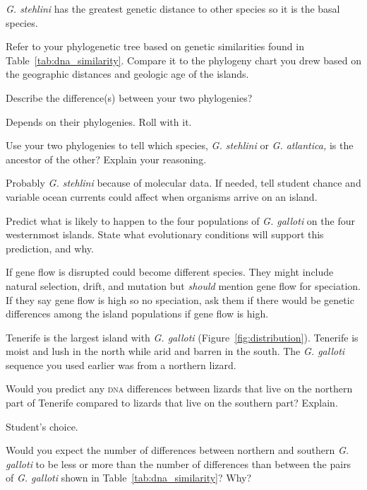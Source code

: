 \documentclass[12pt, hidelinks]{exam}
\newcommand*\AnswerBox[2]{%
    \parbox[t][#1]{0.92\textwidth}{%
    \begin{solution}#2\end{solution}}
    \vspace{\stretch{1}}
}
\begin{document}
\begin{questions}
\AnswerBox{2\baselineskip}{\textit{G. stehlini} has the greatest genetic distance to other species so it is the basal species.}

Refer to your phylogenetic tree based on genetic similarities found in Table~\ref{tab:dna_similarity}. Compare it to the phylogeny chart you drew based on the geographic distances and geologic age of the islands. 

\question Describe the difference(s) between your two phylogenies? 

\AnswerBox{2\baselineskip}{Depends on their phylogenies. Roll with it.}

\question
Use your two phylogenies to tell which species, \textit{G. stehlini} or \textit{G. atlantica,} is the ancestor of the other? Explain your reasoning. 

\AnswerBox{3\baselineskip}{Probably \textit{G. stehlini} because of molecular data. If needed, tell student chance and variable ocean currents could affect when organisms arrive on an island.}

\question
Predict what is likely to happen to the four populations of \textit{G. galloti} on the four westernmost islands. State what evolutionary conditions will support this prediction, and why.

\AnswerBox{3\baselineskip}{If gene flow is disrupted could become different species. They might include natural selection, drift, and mutation but \emph{should} mention gene flow for speciation. If they say gene flow is high so no speciation, ask them if there would be genetic differences among the island populations if gene flow is high.}

\newpage

Tenerife is the largest island with \textit{G. galloti} (Figure~\ref{fig:distribution}). Tenerife is moist and lush in the north while arid and barren in the south. The \textit{G. galloti} sequence you used earlier was from a northern lizard. 

\question
Would you predict any \textsc{dna} differences between lizards that live on the northern part of Tenerife compared to lizards that live on the southern part? Explain.

\AnswerBox{2\baselineskip}{Student's choice.}

\question
Would you expect the number of differences between northern and southern \textit{G. galloti} to be less or more than the number of differences than between the pairs of \textit{G. galloti} shown in Table~\ref{tab:dna_similarity}? Why?


\end{questions}
\end{document}
